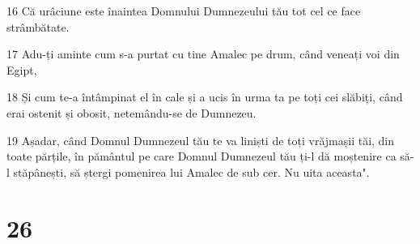 \par 16 Că urâciune este înaintea Domnului Dumnezeului tău tot cel ce face strâmbătate.
\par 17 Adu-ți aminte cum s-a purtat cu tine Amalec pe drum, când veneați voi din Egipt,
\par 18 Și cum te-a întâmpinat el în cale și a ucis în urma ta pe toți cei slăbiți, când erai ostenit și obosit, netemându-se de Dumnezeu.
\par 19 Așadar, când Domnul Dumnezeul tău te va liniști de toți vrăjmașii tăi, din toate părțile, în pământul pe care Domnul Dumnezeul tău ți-l dă moștenire ca să-l stăpânești, să ștergi pomenirea lui Amalec de sub cer. Nu uita aceasta".

\chapter{26}

